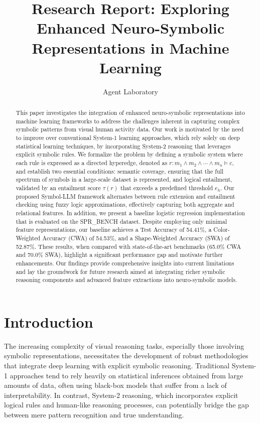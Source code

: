\documentclass[11pt]{article}
\title{Research Report: Exploring Enhanced Neuro-Symbolic Representations in Machine Learning}
\author{Agent Laboratory}
\date{}
\begin{document}
\maketitle

\begin{abstract}
This paper investigates the integration of enhanced neuro-symbolic representations into machine learning frameworks to address the challenges inherent in capturing complex symbolic patterns from visual human activity data. Our work is motivated by the need to improve over conventional System-1 learning approaches, which rely solely on deep statistical learning techniques, by incorporating System-2 reasoning that leverages explicit symbolic rules. We formalize the problem by defining a symbolic system where each rule is expressed as a directed hyperedge, denoted as \( r: m_1 \wedge m_2 \wedge \cdots \wedge m_n \models c \), and establish two essential conditions: semantic coverage, ensuring that the full spectrum of symbols in a large-scale dataset is represented, and logical entailment, validated by an entailment score \(\tau(r)\) that exceeds a predefined threshold \(e_h\). Our proposed Symbol-LLM framework alternates between rule extension and entailment checking using fuzzy logic approximations, effectively capturing both aggregate and relational features. In addition, we present a baseline logistic regression implementation that is evaluated on the SPR\_BENCH dataset. Despite employing only minimal feature representations, our baseline achieves a Test Accuracy of 54.41\%, a Color-Weighted Accuracy (CWA) of 54.53\%, and a Shape-Weighted Accuracy (SWA) of 52.87\%. These results, when compared with state-of-the-art benchmarks (65.0\% CWA and 70.0\% SWA), highlight a significant performance gap and motivate further enhancements. Our findings provide comprehensive insights into current limitations and lay the groundwork for future research aimed at integrating richer symbolic reasoning components and advanced feature extractions into neuro-symbolic models.
\end{abstract}

\section{Introduction}
The increasing complexity of visual reasoning tasks, especially those involving symbolic representations, necessitates the development of robust methodologies that integrate deep learning with explicit symbolic reasoning. Traditional System-1 approaches tend to rely heavily on statistical inferences obtained from large amounts of data, often using black-box models that suffer from a lack of interpretability. In contrast, System-2 reasoning, which incorporates explicit logical rules and human-like reasoning processes, can potentially bridge the gap between mere pattern recognition and true understanding.
\end{document}

